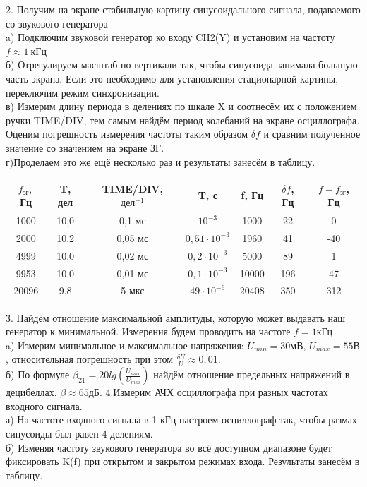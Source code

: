 \documentclass[a4paper, 12pt]{article}
\begin{document}
		2. Получим на экране стабильную картину синусоидального сигнала, подаваемого со звукового генератора \\
			a) Подключим звуковой генератор ко входу CH2(Y) и установим на частоту $f \approx 1\: кГц$ \\
			б) Отрегулируем масштаб по вертикали так, чтобы синусоида занимала большую часть экрана. Если это необходимо для установления стационарной картины, переключим режим синхронизации. \\
			в) Измерим длину периода в делениях по шкале X и соотнесём их с положением ручки TIME/DIV, тем самым найдём период колебаний на экране осциллографа. Оценим погрешность измерения частоты таким образом $\delta f$ и сравним полученное значение со значением на экране ЗГ. \\
			г)Проделаем это же ещё несколько раз и результаты занесём в таблицу. \\
			\begin{longtable}[H]{|c|c|c|c|c|c|c|}
				\hline
				$f_{зг},$ Гц & T, дел & TIME/DIV, $дел^{-1}$ & T, с & f, Гц & $\delta f$, Гц & $f - f_{зг}$, Гц \\
				\hline
				1000 & 10,0 & 0,1 мс & $10^{-3}$ & 1000 & 22 & 0 \\
				2000 & 10,2 & 0,05 мс & $0,51 \cdot 10^{-3}$ & 1960 & 41 & -40 \\
				4999 & 10,0 & 0,02 мс & $0,2 \cdot 10^{-3}$ & 5000 & 89 & 1 \\
				9953 & 10,0 & 0,01 мс & $0,1 \cdot 10^{-3}$ & 10000 & 196 & 47 \\
				20096 & 9,8 & 5 мкс & $49 \cdot 10^{-6}$ & 20408 & 350 & 312 \\
				\hline
			\end{longtable}
		3. Найдём отношение максимальной амплитуды, которую может выдавать наш генератор к минимальной. Измерения будем проводить на частоте $f = 1 кГц$ \\
			a) Измерим минимальное и максимальное напряжения: $U_{min} = 30 мВ$, $U_{max} = 55 В$, относительная погрешность при этом $\frac{\delta U}{U} \approx 0,01$. \\
			б) По формуле $\beta_{21} = 20 lg (\frac{U_{max}}{U_{min}})$ найдём отношение предельных напряжений в децибеллах. $\beta \approx 65 дБ$.
		4.Измерим АЧХ осциллографа при разных частотах входного сигнала.\\
			а) На частоте входного сигнала в 1 кГц настроем осциллограф так, чтобы размах синусоиды был равен 4 делениям. \\
			б) Изменяя частоту звукового генератора во всё доступном диапазоне будет фиксировать K(f) при открытом и закрытом режимах входа. Результаты занесём в таблицу. \\
\end{document}
